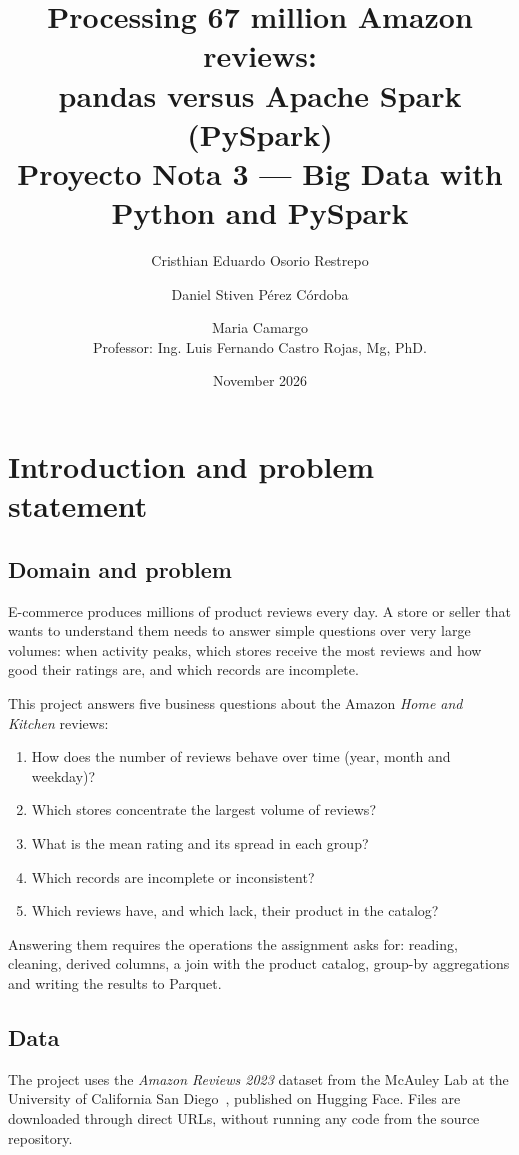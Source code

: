 \documentclass[11pt,a4paper]{article}
\title{Processing 67 million Amazon reviews:\\
pandas versus Apache Spark (PySpark)\\[0.4em]
\large Proyecto Nota 3 --- Big Data with Python and PySpark}
\author{Cristhian Eduardo Osorio Restrepo \and Daniel Stiven Pérez Córdoba \and Maria Camargo\\[0.3em]
\small Professor: Ing. Luis Fernando Castro Rojas, Mg, PhD.}
\date{November 2026}
\begin{document}
\maketitle
\tableofcontents
\newpage

\section{Introduction and problem statement}

\subsection{Domain and problem}

E-commerce produces millions of product reviews every day. A store or seller that wants to
understand them needs to answer simple questions over very large volumes: when activity
peaks, which stores receive the most reviews and how good their ratings are, and which
records are incomplete.

This project answers five business questions about the Amazon \emph{Home and Kitchen}
reviews:

\begin{enumerate}
  \item How does the number of reviews behave over time (year, month and weekday)?
  \item Which stores concentrate the largest volume of reviews?
  \item What is the mean rating and its spread in each group?
  \item Which records are incomplete or inconsistent?
  \item Which reviews have, and which lack, their product in the catalog?
\end{enumerate}

Answering them requires the operations the assignment asks for: reading, cleaning, derived
columns, a join with the product catalog, group-by aggregations and writing the results to
Parquet.

\subsection{Data}

The project uses the \emph{Amazon Reviews 2023} dataset from the McAuley Lab at the
University of California San Diego~\cite{hou2024}, published on Hugging Face. Files are
downloaded through direct URLs, without running any code from the source repository.
\end{document}
